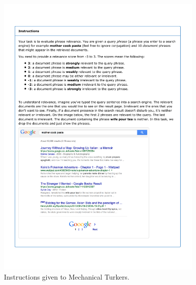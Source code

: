 \begin{figure}
\centering
\includegraphics[width=0.9\textwidth]{figures/instructions}

\caption{Instructions given to Mechanical Turkers.}

\label{fig:instructions}
\end{figure}

